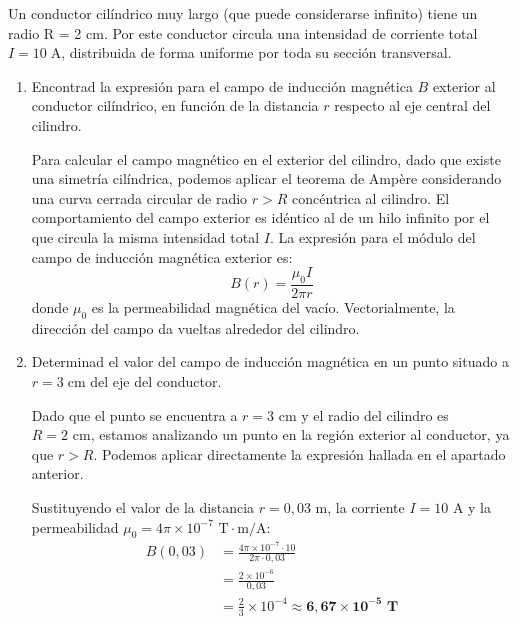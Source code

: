 \documentclass[11pt, a4paper]{article}
\newenvironment{problem}[1][Cuestión]{
	\vspace{0.5cm}
	\noindent{\Large\bfseries #1} \par\vspace{0.5cm}
}{
	\vspace{0.5cm}
}
\begin{document}
	\begin{problem}[Cuestión 7]
		Un conductor cilíndrico muy largo (que puede considerarse infinito) tiene un radio R = 2 cm. Por este conductor circula una intensidad de corriente total $I = 10 \; \text{A}$, distribuida de forma uniforme por toda su sección transversal.

		\begin{enumerate}[label=\alph*)] 
			\item Encontrad la expresión para el campo de inducción magnética $B$ exterior al conductor cilíndrico, en función de la distancia $r$ respecto al eje central del cilindro.

				{ \color{blue} 
					Para calcular el campo magnético en el exterior del cilindro, dado que existe una simetría cilíndrica, podemos aplicar el teorema de Ampère considerando una curva cerrada circular de radio $r > R$ concéntrica al cilindro. El comportamiento del campo exterior es idéntico al de un hilo infinito por el que circula la misma intensidad total $I$. La expresión para el módulo del campo de inducción magnética exterior es:
					\begin{equation*}
						B(r) = \frac{\mu_0 I}{2\pi r}
					\end{equation*}
					donde $\mu_0$ es la permeabilidad magnética del vacío. Vectorialmente, la dirección del campo da vueltas alrededor del cilindro.
				}

			\item Determinad el valor del campo de inducción magnética en un punto situado a $r = 3 \; \text{cm}$ del eje del conductor.

				{ \color{blue} 
					Dado que el punto se encuentra a $r = 3 \text{ cm}$ y el radio del cilindro es $R = 2 \text{ cm}$, estamos analizando un punto en la región exterior al conductor, ya que $r > R$. Podemos aplicar directamente la expresión hallada en el apartado anterior. 

					Sustituyendo el valor de la distancia $r = 0,03 \text{ m}$, la corriente $I = 10 \text{ A}$ y la permeabilidad $\mu_0 = 4\pi \times 10^{-7} \text{ T}\cdot\text{m/A}$:
					\begin{align*}
						B(0,03) &= \frac{4\pi \times 10^{-7} \cdot 10}{2\pi \cdot 0,03} \\
						&= \frac{2 \times 10^{-6}}{0,03} \\
						&= \frac{2}{3} \times 10^{-4} \approx \mathbf{6,67 \times 10^{-5} \text{ T}}
					\end{align*}
				}


\end{enumerate}
\end{problem}
\end{document}
